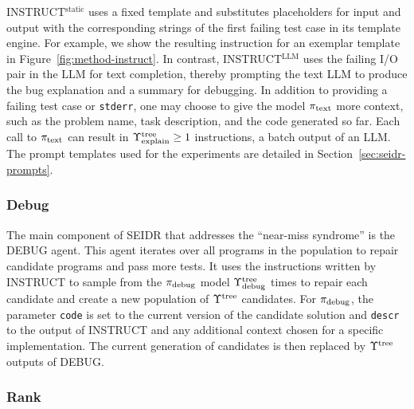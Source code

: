 INSTRUCT$^{\text{static}}$ uses a fixed template and substitutes placeholders for input and output with the corresponding strings of the first failing test case in its template engine.
For example, we show the resulting instruction for an exemplar template in Figure~\ref{fig:method-instruct}.
In contrast, INSTRUCT$^{\text{LLM}}$ uses the failing I/O pair in the LLM for text completion, thereby prompting the text LLM to produce the bug explanation and a summary for debugging. 
In addition to providing a failing test case or \texttt{stderr}, one may choose to give the model $ \pi_\text{text} $ more context, such as the problem name, task description, and the code generated so far. 
Each call to $ \pi_\text{text} $ can result in $\Upsilon^\text{tree}_\text{explain}\ge1$ instructions, a batch output of an LLM.
The prompt templates used for the experiments are detailed in Section~\ref{sec:seidr-prompts}.


\subsubsection{Debug}

The main component of SEIDR that addresses the ``near-miss syndrome'' is the DEBUG agent.  
This agent iterates over all programs in the population to repair candidate programs and pass more tests. 
It uses the instructions written by INSTRUCT to sample from the $ \pi_\text{debug} $ model $\Upsilon^\text{tree}_\text{debug}$ times
to repair each candidate and create a new population of $\Upsilon^\text{tree}{}$ candidates.
For $ \pi_\text{debug} $, the parameter \texttt{code} is set to the current version of the candidate solution and \texttt{descr} to the output of INSTRUCT and any additional context chosen for a specific implementation.
The current generation of candidates is then replaced by $\Upsilon^\text{tree}{}$ outputs of DEBUG.

\subsubsection{Rank}

